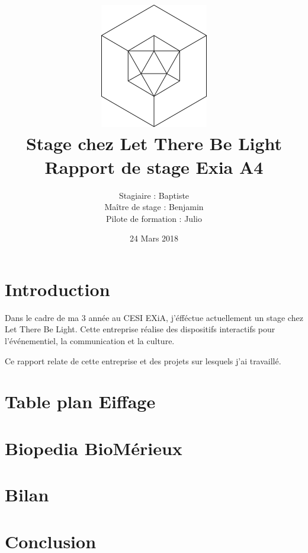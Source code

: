 \documentclass{article}
\title{\includegraphics{img/logo.png}\vspace{2cm}\\
    Stage chez Let There Be Light \\
    \large Rapport de stage Exia A4}
\date{24 Mars 2018}
\author{Stagiaire : Baptiste \bsc{Saclier} \\
    Maître de stage : Benjamin \bsc{Petit}\\
    Pilote de formation : Julio \bsc{Santilario}}
\begin{document}
    \maketitle

    \clearpage

    \tableofcontents

    \section{Introduction}

    Dans le cadre de ma 3 année au CESI EXiA, j'éfféctue actuellement un stage chez Let There Be Light.
    Cette entreprise réalise des dispositifs interactifs pour l'événementiel, la communication et la culture.

    Ce rapport relate de cette entreprise et des projets sur lesquels j'ai travaillé.

    \clearpage

    

    

    

    

    

    \section{Table plan Eiffage}

    \section{Biopedia BioMérieux}

    \section{Bilan}

    \section{Conclusion}
\end{document}
